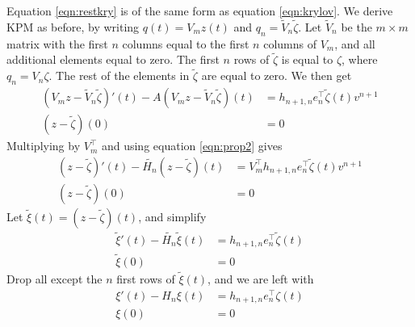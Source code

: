 Equation \eqref{eqn:restkry} is of the same form as equation \eqref{eqn:krylov}. We derive KPM as before, by writing $q(t) = V_m z(t)$ and $q_n = \tilde{V}_n \tilde{\zeta} $. Let $\tilde{V}_n$ be the $m \times m$ matrix with the first $n$ columns equal to the first $n$ columns of $V_m$, and all additional elements equal to zero. The first $n$ rows of  $\tilde{\zeta}$ is equal to $\zeta$, where $q_n = V_n \zeta$. The rest of the elements in $\tilde{\zeta}$ are equal to zero.
We then get
\begin{equation*}
\begin{aligned}
 (V_m z-\tilde{V}_n \tilde{\zeta})'(t)-A (V_m z-\tilde{V}_n \tilde{\zeta})(t) &=  h_{n+1,n}e_n^\top \tilde{\zeta}(t) v^{n+1}  \\
(z-\tilde{\zeta})(0)& = 0 
\end{aligned}
\end{equation*}
Multiplying by $V_m^{\top}$ and using equation \eqref{eqn:prop2} gives
\begin{equation*}
\begin{aligned}
 (z-\tilde{\zeta})'(t)-\tilde{H_n} (z-\tilde{\zeta})(t) &= V_m^\top h_{n+1,n}e_n^\top \tilde{\zeta}(t) v^{n+1}  \\
(z-\tilde{\zeta})(0)& = 0
\end{aligned}
\end{equation*}
Let $\tilde{\xi}(t) = (z-\tilde{\zeta})(t)$, and simplify
\begin{equation*} 
\begin{aligned}
 \tilde{\xi} '(t) -\tilde{H_n} \tilde{\xi}(t) &= h_{n+1,n}e_n^\top \tilde{\zeta} (t)  \\
\tilde{\xi}(0)& = 0
\end{aligned}
\end{equation*}
Drop all except the $n$ first rows of $\tilde{\xi}(t)$, and we are left with
\begin{equation}\label{eqn:restkry2}
\begin{aligned}
 \xi '(t) -H_n \xi(t) &= h_{n+1,n}e_n^\top \zeta (t)  \\
\xi(0)& = 0
\end{aligned}
\end{equation}

